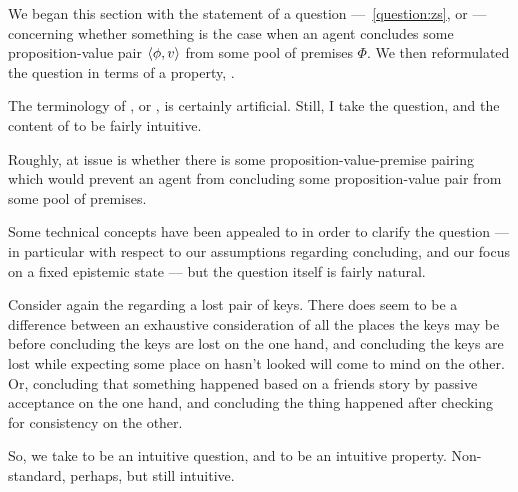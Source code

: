 \begin{note}
  We began this section with the statement of a question ---~\autoref{question:zs}, or \qzS{}  --- concerning whether something is the case when an agent concludes some proposition-value pair \(\langle \phi, v \rangle\) from some pool of premises \(\Phi\).
  We then reformulated the question in terms of a property, \zS{}.

  The terminology of \zS{}, or , is certainly artificial.
  Still, I take the question, and the content of \zS{} to be fairly intuitive.

  Roughly, at issue is whether there is some proposition-value-premise pairing which would prevent an agent from concluding some proposition-value pair from some pool of premises.

  Some technical concepts have been appealed to in order to clarify the question --- in particular with respect to our assumptions regarding concluding, and our focus on a fixed epistemic state --- but the question itself is fairly natural.

  Consider again the  regarding a lost pair of keys.
  There does seem to be a difference between an exhaustive consideration of all the places the keys may be before concluding the keys are lost on the one hand, and concluding the keys are lost while expecting some place on hasn't looked will come to mind on the other.
  Or, concluding that something happened based on a friends story by passive acceptance on the one hand, and concluding the thing happened after checking for consistency on the other.

  So, we take \qzS{} to be an intuitive question, and \zS{} to be an intuitive property.
  Non-standard, perhaps, but still intuitive.
\end{note}


